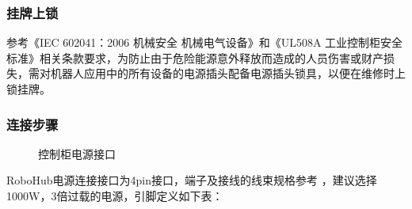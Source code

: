 \documentclass[a4paper,11pt,english,openany,oneside]{sphinxmanual}
\begin{document}
\subsubsection{挂牌上锁}
\label{\detokenize{08 _u5b89_u88c5_u4e0e_u8c03_u8bd5:id60}}
\sphinxAtStartPar
参考《IEC 60204\sphinxhyphen{}1：2006 机械安全 机械电气设备》和《UL508A 工业控制柜安全标准》相关条款要求，为防止由于危险能源意外释放而造成的人员伤害或财产损失，需对机器人应用中的所有设备的电源插头配备电源插头锁具，以便在维修时上锁挂牌。


\subsubsection{连接步骤}
\label{\detokenize{08 _u5b89_u88c5_u4e0e_u8c03_u8bd5:id61}}
\begin{figure}[H]
\centering
\capstart

\noindent{}
\caption{控制柜电源接口}\label{\detokenize{08 _u5b89_u88c5_u4e0e_u8c03_u8bd5:id109}}\end{figure}



\sphinxAtStartPar
RoboHub电源连接接口为4pin接口，端子及接线的线束规格参考 {\hyperref[\detokenize{07 _u6280_u672f_u89c4_u683c:id9}]{}} ，建议选择1000W，3倍过载的电源，引脚定义如下表：
\end{document}
